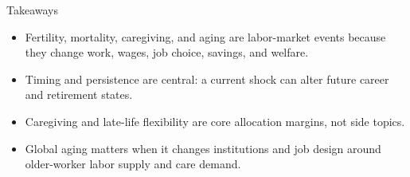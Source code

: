 \documentclass[aspectratio=169,11pt]{beamer}
\begin{document}
\begin{frame}{Takeaways}
\begin{itemize}
    \item Fertility, mortality, caregiving, and aging are labor-market events because they change work, wages, job choice, savings, and welfare.
    \item Timing and persistence are central: a current shock can alter future career and retirement states.
    \item Caregiving and late-life flexibility are core allocation margins, not side topics.
    \item Global aging matters when it changes institutions and job design around older-worker labor supply and care demand.
\end{itemize}
\end{frame}
\end{document}
